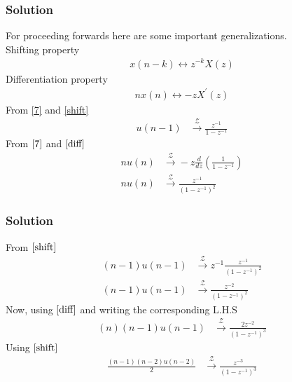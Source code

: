 \documentclass{beamer}
\providecommand{\brak}[1]{\ensuremath{\left(#1\right)}}
\theoremstyle{remark}
\begin{document}
\begin{frame}
\frametitle{Solution}
For proceeding forwards here are some important generalizations.\\
Shifting property
\begin{align}
x(n-k) \leftrightarrow z^{-k} X(z) \label{shift}
\end{align}
Differentiation property
\begin{align}
nx(n) \leftrightarrow -zX^{\prime}(z) \label{diff}
\end{align}
From \eqref{7} and \eqref{shift}
\begin{align}
u\brak{n-1} &\xrightarrow{\mathcal{Z}} \frac{z^{-1}}{1-z^{-1}} \label{21}
\end{align}
From $\eqref{7}$ and $\eqref{diff}$
\begin{align}
nu\brak{n} &\xrightarrow{\mathcal{Z}} -z\frac{d}{dz}\brak{\frac{1}{1-z^{-1}}}\\
nu\brak{n}    &\xrightarrow{\mathcal{Z}} \frac{z^{-1}}{\brak{1-z^{-1}}^{2}}
\end{align}
    
\end{frame}












\begin{frame}
\frametitle{Solution}
From $\eqref{shift}$
\begin{align}
(n-1)u\brak{n-1}    &\xrightarrow{\mathcal{Z}} z^{-1}\frac{z^{-1}}{\brak{1-z^{-1}}^{2}}\\
(n-1)u\brak{n-1}    &\xrightarrow{\mathcal{Z}} \frac{z^{-2}}{\brak{1-z^{-1}}^{2}} \label{22}
\end{align}
Now, using $\eqref{diff}$ and writing the corresponding L.H.S
\begin{align}   
(n)(n-1)u\brak{n-1}    &\xrightarrow{\mathcal{Z}} \frac{2z^{-2}}{\brak{1-z^{-1}}^3} 
\end{align}
Using $\eqref{shift}$
\begin{align}
    \frac{(n-1)(n-2)u\brak{n-2}}{2}    &\xrightarrow{\mathcal{Z}} \frac{z^{-3}}{\brak{1-z^{-1}}^3} \label{23} 
\end{align}
\end{frame}
\end{document}
